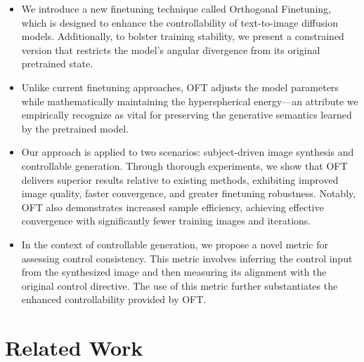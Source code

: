 \begin{itemize}[leftmargin=*,nosep]

    \item We introduce a new finetuning technique called Orthogonal Finetuning, which is designed to enhance the controllability of text-to-image diffusion models. Additionally, to bolster training stability, we present a constrained version that restricts the model's angular divergence from its original pretrained state.
    \item Unlike current finetuning approaches, OFT adjusts the model parameters while mathematically maintaining the hyperspherical energy—an attribute we empirically recognize as vital for preserving the generative semantics learned by the pretrained model.
    \item Our approach is applied to two scenarios: subject-driven image synthesis and controllable generation. Through thorough experiments, we show that OFT delivers superior results relative to existing methods, exhibiting improved image quality, faster convergence, and greater finetuning robustness. Notably, OFT also demonstrates increased sample efficiency, achieving effective convergence with significantly fewer training images and iterations.
    \item In the context of controllable generation, we propose a novel metric for assessing control consistency. This metric involves inferring the control input from the synthesized image and then measuring its alignment with the original control directive. The use of this metric further substantiates the enhanced controllability provided by OFT.
\end{itemize}

\section{Related Work}

